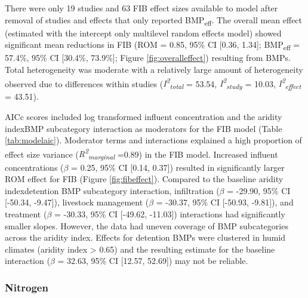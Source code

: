 \documentclass[utf8]{FrontiersinHarvard}
\begin{document}
There were only 19 studies and 63 FIB effect sizes available to model after removal of studies and effects that only reported BMP\textsubscript{eff}.
The overall mean effect (estimated with the intercept only multilevel random effects model) showed significant mean reductions in FIB (ROM = 0.85, 95\% CI {[}0.36, 1.34{]}; BMP\textsubscript{eff} = 57.4\%, 95\% CI {[}30.4\%, 73.9\%{]}; Figure \ref{fig:overalleffect}) resulting from BMPs.
Total heterogeneity was moderate with a relatively large amount of heterogeneity observed due to differences within studies (\textit{I\textsuperscript{2}\textsubscript{total}} = 53.54, \textit{I\textsuperscript{2}\textsubscript{study}} = 10.03, \textit{I\textsuperscript{2}\textsubscript{effect}} = 43.51).

AICc scores included log transformed influent concentration and the aridity index\texttimes BMP subcategory interaction as moderators for the FIB model (Table \ref{tab:modelaic}).
Moderator terms and interactions explained a high proportion of effect size variance (\textit{R\textsuperscript{2}\textsubscript{marginal}} =0.89) in the FIB model.
Increased influent concentrations (\(\beta\) = 0.25, 95\% CI {[}0.14, 0.37{]}) resulted in significantly larger ROM effect for FIB (Figure \ref{fig:fibeffect}).
Compared to the baseline aridity index\texttimes detention BMP subcategory interaction, infiltration (\(\beta\) = -29.90, 95\% CI {[}-50.34, -9.47{]}), livestock management (\(\beta\) = -30.37, 95\% CI {[}-50.93, -9.81{]}), and treatment (\(\beta\) = -30.33, 95\% CI {[}-49.62, -11.03{]}) interactions had significantly smaller slopes.
However, the data had uneven coverage of BMP subcategories across the aridity index.
Effects for detention BMPs were clustered in humid climates (aridity index \textgreater{} 0.65) and the resulting estimate for the baseline interaction (\(\beta\) = 32.63, 95\% CI {[}12.57, 52.69{]}) may not be reliable.

\hypertarget{nitrogen}{%
\subsubsection{Nitrogen}\label{nitrogen}}
\end{document}
